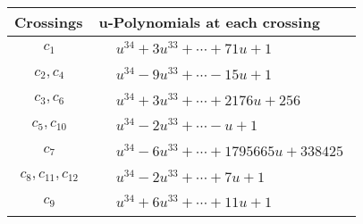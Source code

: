 \documentclass[1p]{elsarticle_modified}
\theoremstyle{definition}
\begin{document}
\begin{tabular}{m{50pt}|m{274pt}}
Crossings & \hspace{64pt}u-Polynomials at each crossing \\
\hline $$\begin{aligned}c_{1}\end{aligned}$$&$\begin{aligned}
&u^{34}+3 u^{33}+\cdots+71 u+1
\end{aligned}$\\
\hline $$\begin{aligned}c_{2},c_{4}\end{aligned}$$&$\begin{aligned}
&u^{34}-9 u^{33}+\cdots-15 u+1
\end{aligned}$\\
\hline $$\begin{aligned}c_{3},c_{6}\end{aligned}$$&$\begin{aligned}
&u^{34}+3 u^{33}+\cdots+2176 u+256
\end{aligned}$\\
\hline $$\begin{aligned}c_{5},c_{10}\end{aligned}$$&$\begin{aligned}
&u^{34}-2 u^{33}+\cdots- u+1
\end{aligned}$\\
\hline $$\begin{aligned}c_{7}\end{aligned}$$&$\begin{aligned}
&u^{34}-6 u^{33}+\cdots+1795665 u+338425
\end{aligned}$\\
\hline $$\begin{aligned}c_{8},c_{11},c_{12}\end{aligned}$$&$\begin{aligned}
&u^{34}-2 u^{33}+\cdots+7 u+1
\end{aligned}$\\
\hline $$\begin{aligned}c_{9}\end{aligned}$$&$\begin{aligned}
&u^{34}+6 u^{33}+\cdots+11 u+1
\end{aligned}$\\
\hline
\end{tabular}\\~\\
\newpage\renewcommand{\arraystretch}{1}
\end{document}
